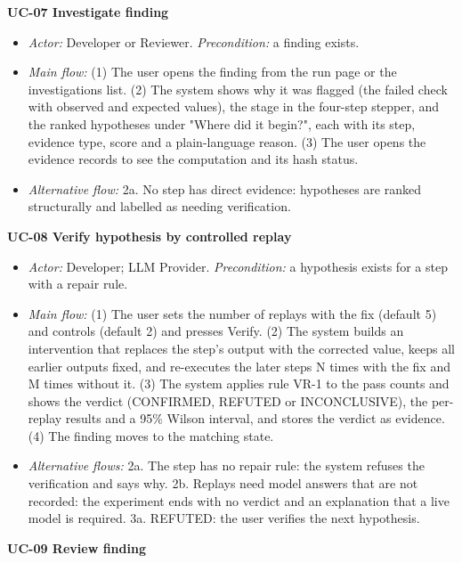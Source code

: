\documentclass{fast-nuces-bs}
\begin{document}
\textbf{UC-07 Investigate finding}

\begin{itemize}
\item \textit{Actor:} Developer or Reviewer. \textit{Precondition:} a finding exists.
\item \textit{Main flow:} (1) The user opens the finding from the run page or the investigations list. (2) The system shows why it was flagged (the failed check with observed and expected values), the stage in the four-step stepper, and the ranked hypotheses under "Where did it begin?", each with its step, evidence type, score and a plain-language reason. (3) The user opens the evidence records to see the computation and its hash status.
\item \textit{Alternative flow:} 2a. No step has direct evidence: hypotheses are ranked structurally and labelled as needing verification.
\end{itemize}

\textbf{UC-08 Verify hypothesis by controlled replay}

\begin{itemize}
\item \textit{Actor:} Developer; LLM Provider. \textit{Precondition:} a hypothesis exists for a step with a repair rule.
\item \textit{Main flow:} (1) The user sets the number of replays with the fix (default 5) and controls (default 2) and presses Verify. (2) The system builds an intervention that replaces the step's output with the corrected value, keeps all earlier outputs fixed, and re-executes the later steps N times with the fix and M times without it. (3) The system applies rule VR-1 to the pass counts and shows the verdict (CONFIRMED, REFUTED or INCONCLUSIVE), the per-replay results and a 95\% Wilson interval, and stores the verdict as evidence. (4) The finding moves to the matching state.
\item \textit{Alternative flows:} 2a. The step has no repair rule: the system refuses the verification and says why. 2b. Replays need model answers that are not recorded: the experiment ends with no verdict and an explanation that a live model is required. 3a. REFUTED: the user verifies the next hypothesis.
\end{itemize}

\textbf{UC-09 Review finding}
\end{document}
